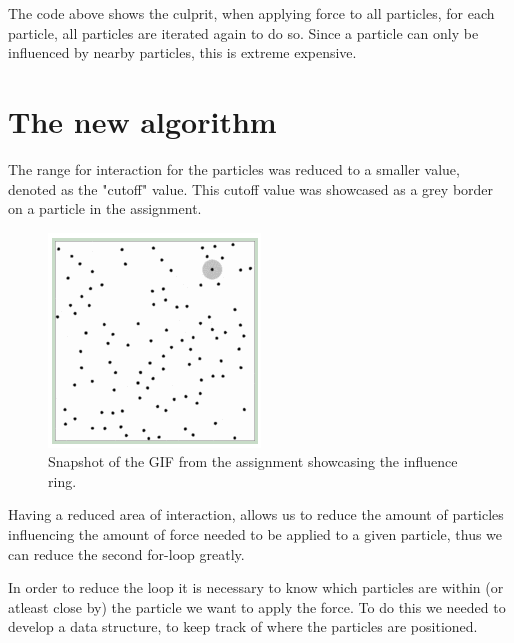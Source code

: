 \documentclass[a4paper,11pt,oneside]{book}
\begin{document}
The code above shows the culprit, when applying force to all particles, for each particle, all particles are iterated again to do so. Since a particle can only be influenced by nearby particles, this is extreme expensive.

\section{The new algorithm}
The range for interaction for the particles was reduced to a smaller value, denoted as the "cutoff" value. This cutoff value was showcased as a grey border on a particle in the assignment.

\begin{figure}[H]
  \centering
  \begin{minipage}[b]{0.4\textwidth}
    \includegraphics[width=\textwidth]{cutoff.png}
    \caption{Snapshot of the GIF from the assignment showcasing the influence ring.}
  \end{minipage}
\end{figure}

Having a reduced area of interaction, allows us to reduce the amount of particles influencing the amount of force needed to be applied to a given particle, thus we can reduce the second for-loop greatly.

In order to reduce the loop it is necessary to know which particles are within (or atleast close by) the particle we want to apply the force. To do this we needed to develop a data structure, to keep track of where the particles are positioned.
\end{document}
